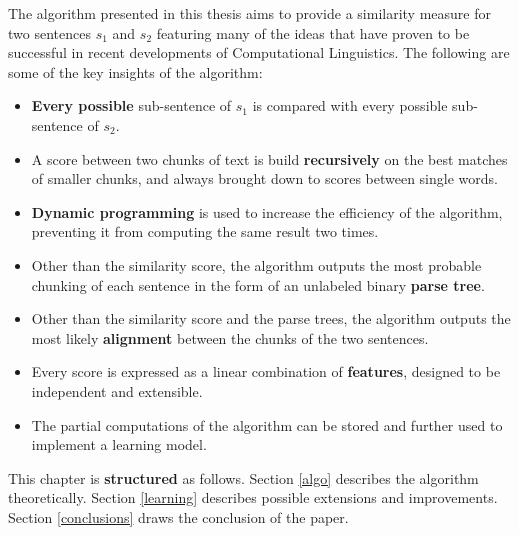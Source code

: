 
The algorithm presented in this thesis aims to provide a similarity measure for two sentences $s_1$ and $s_2$ featuring many of the ideas that have proven to be successful in recent developments of Computational Linguistics. The following are some of the key insights of the algorithm:

\begin{itemize}
\item \textbf{Every possible} sub-sentence of $s_1$ is compared with every possible sub-sentence of $s_2$.
\item A score between two chunks of text is build \textbf{recursively} on the best matches of smaller chunks, and always brought down to scores between single words.
\item \textbf{Dynamic programming} is used to increase the efficiency of the algorithm, preventing it from computing the same result two times.
\item Other than the similarity score, the algorithm outputs the most probable chunking of each sentence in the form of an unlabeled binary \textbf{parse tree}.
\item Other than the similarity score and the parse trees, the algorithm outputs the most likely \textbf{alignment} between the chunks of the two sentences.
\item Every score is expressed as a linear combination of \textbf{features}, designed to be independent and extensible.
\item The partial computations of the algorithm can be stored and further used to implement a learning model.
\end{itemize}

This chapter is \textbf{structured} as follows. Section \ref{algo} describes the algorithm theoretically. %
Section \ref{learning} describes possible extensions and improvements. Section \ref{conclusions} draws the conclusion of the paper.

